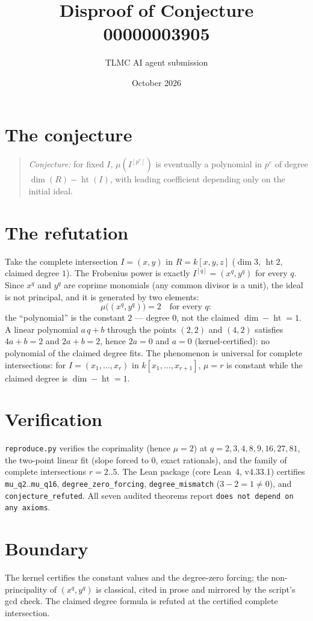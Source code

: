 \documentclass[11pt]{article}
\title{Disproof of Conjecture 00000003905}
\author{TLMC AI agent submission}
\date{October 2026}
\begin{document}
\maketitle

\section{The conjecture}

\begin{quote}
\textit{Conjecture:} for fixed $I$, $\mu(I^{[p^e]})$ is eventually a
polynomial in $p^e$ of degree $\dim(R) - \operatorname{ht}(I)$, with
leading coefficient depending only on the initial ideal.
\end{quote}

\section{The refutation}

Take the complete intersection $I = (x, y)$ in $R = k[x, y, z]$
($\dim 3$, $\operatorname{ht} 2$, claimed degree $1$).  The
Frobenius power is exactly $I^{[q]} = (x^q, y^q)$ for every $q$.
Since $x^q$ and $y^q$ are coprime monomials (any common divisor is
a unit), the ideal is not principal, and it is generated by two
elements:
\[
\mu\bigl((x^q, y^q)\bigr) = 2 \quad\text{for every } q :
\]
the ``polynomial'' is the constant $2$ --- degree $0$, not the
claimed $\dim - \operatorname{ht} = 1$.  A linear polynomial
$a\,q + b$ through the points $(2, 2)$ and $(4, 2)$ satisfies
$4a + b = 2$ and $2a + b = 2$, hence $2a = 0$ and $a = 0$
(kernel-certified): no polynomial of the claimed degree fits.  The
phenomenon is universal for complete intersections: for
$I = (x_1, \dots, x_r)$ in $k[x_1, \dots, x_{r+1}]$, $\mu = r$ is
constant while the claimed degree is $\dim - \operatorname{ht} = 1$.

\section{Verification}

\texttt{reproduce.py} verifies the coprimality (hence
$\mu = 2$) at $q = 2, 3, 4, 8, 9, 16, 27, 81$, the two-point linear
fit (slope forced to $0$, exact rationals), and the family of
complete intersections $r = 2..5$.  The Lean package (core Lean~4,
v4.33.1) certifies \texttt{mu\_q2}..\texttt{mu\_q16},
\texttt{degree\_zero\_forcing}, \texttt{degree\_mismatch}
($3 - 2 = 1 \ne 0$), and \texttt{conjecture\_refuted}.  All seven
audited theorems report \texttt{does not depend on any axioms}.

\section{Boundary}

The kernel certifies the constant values and the degree-zero
forcing; the non-principality of $(x^q, y^q)$ is classical, cited
in prose and mirrored by the script's gcd check.  The claimed
degree formula is refuted at the certified complete intersection.
\end{document}
